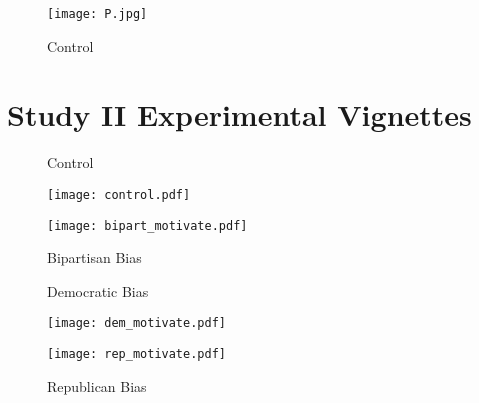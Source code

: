 \documentclass[12pt, letterpaper]{article}
\begin{document}
\begin{figure}[ht]
\centering
\begin{minipage}[b][12cm][b]{0.45\linewidth}
\caption{Control}
\texttt{[image: P.jpg]}
\label{fig:minipage5}
\end{minipage}
\end{figure}

\clearpage 

\section{Study II Experimental Vignettes}

\begin{figure}[ht]
\centering
\begin{minipage}[b][12cm][b]{0.45\linewidth}
\caption{Control}
\texttt{[image: control.pdf]}
\label{fig:minipage3}
\end{minipage}
\quad
\begin{minipage}[b]{0.45\linewidth}
\caption{Bipartisan Bias}
\texttt{[image: bipart\_motivate.pdf]}
\label{fig:minipage4}
\end{minipage}
\end{figure}

\begin{figure}[ht]
\centering
\begin{minipage}[b][12cm][b]{0.45\linewidth}
\caption{Democratic Bias}
\texttt{[image: dem\_motivate.pdf]}
\label{fig:minipage1}
\end{minipage}
\quad
\begin{minipage}[b]{0.45\linewidth}
\caption{Republican Bias}
\texttt{[image: rep\_motivate.pdf]}
\label{fig:minipage2}
\end{minipage}
\end{figure}
\end{document}
